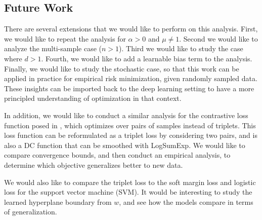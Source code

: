 \documentclass[11pt]{article}
\begin{document}
\subsection{Future Work}

There are several extensions that we would like to perform on this analysis. First, we would like to repeat the analysis for $\alpha > 0$ and $\mu \neq 1$. Second we would like to analyze the multi-sample case ($n > 1$). Third we would like to study the case where $d > 1$. Fourth, we would like to add a learnable bias term to the analysis. Finally, we would like to study the stochastic case, so that this work can be applied in practice for empirical risk minimization, given randomly sampled data. These insights can be imported back to the deep learning setting to have a more principled understanding of optimization in that context.

In addition, we would like to conduct a similar analysis for the contrastive loss function posed in \cite{hadsell_dimensionality_2006}, which optimizes over pairs of samples instead of triplets. This loss function can be reformulated as a triplet loss by considering two pairs, and is also a DC function that can be smoothed with LogSumExp. We would like to compare convergence bounds, and then conduct an empirical analysis, to determine which objective generalizes better to new data.

We would also like to compare the triplet loss to the soft margin loss and logistic loss for the support vector machine (SVM). It would be interesting to study the learned hyperplane boundary from $w$, and see how the models compare in terms of generalization.


\end{document}
